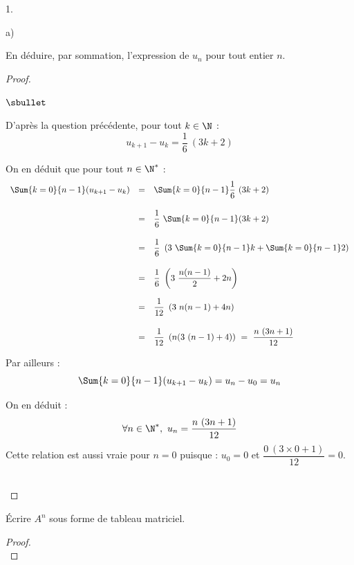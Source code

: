 \documentclass[11pt]{article}%
\begin{document}
\begin{noliste}{1.}
\begin{noliste}{a)}
  \item En déduire, par sommation, l'expression de $u_{n}$ pour tout
    entier $n$.

    \begin{proof}~%
      \begin{noliste}{$\sbullet$}
      \item D'après la question précédente, pour tout $k \in \N$ :
        \[
        u_{k+1} - u_k = \dfrac{1}{6} \ (3k + 2)
        \]
      \item On en déduit que pour tout $n \in \N^*$ : 
        \[
        \begin{array}{rcl}
          \Sum{k=0}{n-1} (u_{k+1} - u_k) & = & \Sum{k=0}{n-1}
          \dfrac{1}{6} \ (3k + 2) 
          \\[.6cm]
          & = & \dfrac{1}{6} \ \Sum{k=0}{n-1} (3k + 2) 
          \\[.6cm]
          & = & \dfrac{1}{6} \ \left(3 \ \Sum{k=0}{n-1} k +
            \Sum{k=0}{n-1} 2 \right) 
          \\[.6cm]
          & = & \dfrac{1}{6} \ \left(3 \ \dfrac{n(n-1)}{2} + 2 n
          \right) 
          \\[.6cm]
          & = & \dfrac{1}{12} \ \left(3 \ n(n-1) + 4 n \right) 
          \\[.6cm]
          & = & \dfrac{1}{12} \ \left( n (3 \ (n-1) + 4) \right) 
          \ = \ \dfrac{n \ (3n+1)}{12}
        \end{array}
        \]
      \item Par ailleurs :
        \[
        \Sum{k=0}{n-1} (u_{k+1} - u_k) = u_n - u_0 = u_n
        \]        
      \item On en déduit : 
        \[
        \forall n \in \N^*, \ u_n = \dfrac{n \ (3n+1)}{12}
        \]
        Cette relation est aussi vraie pour $n = 0$ puisque : $u_0 =
        0$ et $\dfrac{0 \ (3 \times 0+1)}{12} = 0$.
      \end{noliste}
      ~\\[-1cm]
    \end{proof}

  \item Écrire $A^{n}$ sous forme de tableau matriciel.

    \begin{proof}~%
    ~\\[-1.2cm]
    \end{proof}
  \end{noliste}
\end{noliste}
\end{document}
